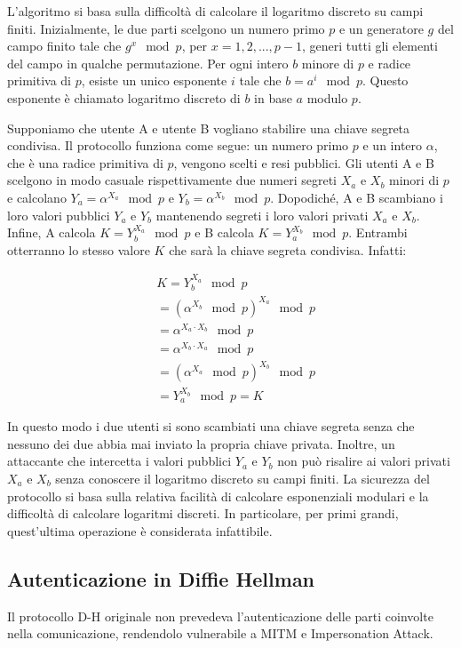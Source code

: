 \documentclass{article}
\begin{document}
L'algoritmo si basa sulla difficoltà di calcolare il logaritmo discreto su campi finiti.
Inizialmente, le due parti scelgono un numero primo $p$ e un generatore $g$ del campo finito tale che $g^x \mod p$, per $x = 1, 2, ..., p-1$, generi tutti gli elementi del campo in qualche permutazione.
Per ogni intero $b$ minore di $p$ e radice primitiva di $p$, esiste un unico esponente $i$ tale che $b = a^i \mod p$. Questo esponente è chiamato logaritmo discreto di $b$ in base $a$ modulo $p$.

Supponiamo che utente A e utente B vogliano stabilire una chiave segreta condivisa. Il protocollo funziona come segue:
un numero primo $p$ e un intero $\alpha$, che è una radice primitiva di $p$, vengono scelti e resi pubblici. Gli utenti A e B scelgono in modo casuale rispettivamente due numeri segreti $X_a$ e $X_b$ minori di $p$ e calcolano $Y_a = \alpha^{X_a} \mod p$ e $Y_b = \alpha^{X_b} \mod p$.
Dopodiché, A e B scambiano i loro valori pubblici $Y_a$ e $Y_b$ mantenendo segreti i loro valori privati $X_a$ e $X_b$.
Infine, A calcola $K = Y_b^{X_a} \mod p$ e B calcola $K = Y_a^{X_b} \mod p$. Entrambi otterranno lo stesso valore $K$ che sarà la chiave segreta condivisa.
Infatti:

\begin{equation}
	\begin{aligned}
		&K = Y_b^{X_a} \mod p \\
		&= (\alpha^{X_b} \mod p)^{X_a} \mod p \\
		&= \alpha^{X_a \cdot X_b} \mod p \\
		&= \alpha^{X_b \cdot X_a} \mod p \\
		&= (\alpha^{X_a} \mod p)^{X_b} \mod p \\
		&= Y_a^{X_b} \mod p = K
	\end{aligned}
\end{equation}

In questo modo i due utenti si sono scambiati una chiave segreta senza che nessuno dei due abbia mai inviato la propria chiave privata.
Inoltre, un attaccante che intercetta i valori pubblici $Y_a$ e $Y_b$ non può risalire ai valori privati $X_a$ e $X_b$ senza conoscere il logaritmo discreto su campi finiti.
La sicurezza del protocollo si basa sulla relativa facilità di calcolare esponenziali modulari e la difficoltà di calcolare logaritmi discreti. In particolare, per primi grandi, quest'ultima operazione è considerata infattibile.

\subsection{Autenticazione in Diffie Hellman}
Il protocollo D-H originale non prevedeva l'autenticazione delle parti coinvolte nella comunicazione, rendendolo vulnerabile a MITM e Impersonation Attack.
\end{document}
